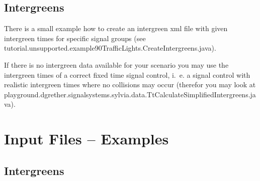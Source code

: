 \subsection{Intergreens}

There is a small example how to create an intergreen xml file with given
intergreen times for specific signal groups (see
tutorial.unsupported.example90TrafficLights.CreateIntergreens.java).

If there is no intergreen data available for your scenario you may use the
intergreen times of a correct fixed time signal control, i.~e. a signal control
with realistic intergreen times where no collisions may occur (therefor you may
look at playground.dgrether.signalsystems.sylvia.data.TtCalculateSimplifiedIntergreens.java).

\section{Input Files -- Examples}

\subsection{Intergreens}
\lstset{breaklines=true,language=XML}



\texttt{\nolinebreak  }




\texttt{\nolinebreak  }
